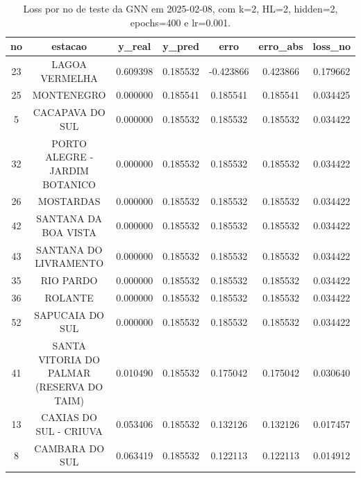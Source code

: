 \begin{table}[h]
\centering
\caption{Loss por no de teste da GNN em 2025-02-08, com k=2, HL=2, hidden=2, epochs=400 e lr=0.001.}
\label{tab:gnn_loss_k2_hl2_h2_e400_d20250208}
\begin{tabular}{ccccccc}
\toprule
no & estacao & y\_real & y\_pred & erro & erro\_abs & loss\_no \\
\midrule
23 & LAGOA VERMELHA & 0.609398 & 0.185532 & -0.423866 & 0.423866 & 0.179662 \\
25 & MONTENEGRO & 0.000000 & 0.185541 & 0.185541 & 0.185541 & 0.034425 \\
5 & CACAPAVA DO SUL & 0.000000 & 0.185532 & 0.185532 & 0.185532 & 0.034422 \\
32 & PORTO ALEGRE - JARDIM BOTANICO & 0.000000 & 0.185532 & 0.185532 & 0.185532 & 0.034422 \\
26 & MOSTARDAS & 0.000000 & 0.185532 & 0.185532 & 0.185532 & 0.034422 \\
42 & SANTANA DA BOA VISTA & 0.000000 & 0.185532 & 0.185532 & 0.185532 & 0.034422 \\
43 & SANTANA DO LIVRAMENTO & 0.000000 & 0.185532 & 0.185532 & 0.185532 & 0.034422 \\
35 & RIO PARDO & 0.000000 & 0.185532 & 0.185532 & 0.185532 & 0.034422 \\
36 & ROLANTE & 0.000000 & 0.185532 & 0.185532 & 0.185532 & 0.034422 \\
52 & SAPUCAIA DO SUL & 0.000000 & 0.185532 & 0.185532 & 0.185532 & 0.034422 \\
41 & SANTA VITORIA DO PALMAR (RESERVA DO TAIM) & 0.010490 & 0.185532 & 0.175042 & 0.175042 & 0.030640 \\
13 & CAXIAS DO SUL - CRIUVA & 0.053406 & 0.185532 & 0.132126 & 0.132126 & 0.017457 \\
8 & CAMBARA DO SUL & 0.063419 & 0.185532 & 0.122113 & 0.122113 & 0.014912 \\
\bottomrule
\end{tabular}
\end{table}
